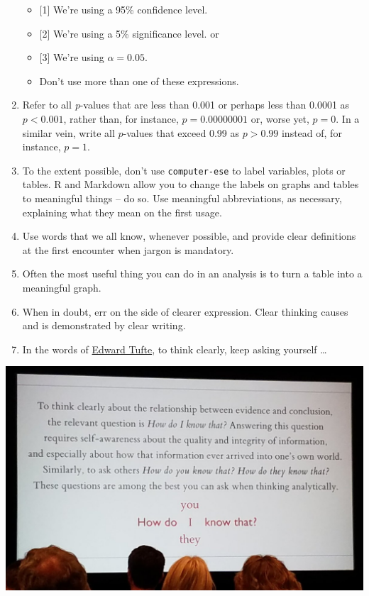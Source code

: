 \documentclass[
]{book}
\providecommand{\tightlist}{%
  \setlength{\itemsep}{0pt}\setlength{\parskip}{0pt}}
\begin{document}
\begin{enumerate}
  \begin{itemize}
  \tightlist
  \item
    {[}1{]} We're using a 95\% confidence level.\\
  \item
    {[}2{]} We're using a 5\% significance level. or
  \item
    {[}3{]} We're using \(\alpha = 0.05\).\\
  \item
    Don't use more than one of these expressions.
  \end{itemize}
\item
  Refer to all \emph{p}-values that are less than 0.001 or perhaps less than 0.0001 as \(p < 0.001\), rather than, for instance, \(p = 0.00000001\) or, worse yet, \(p = 0\). In a similar vein, write all \(p\)-values that exceed 0.99 as \(p > 0.99\) instead of, for instance, \(p = 1\).
\item
  To the extent possible, don't use \texttt{computer-ese} to label variables, plots or tables. R and Markdown allow you to change the labels on graphs and tables to meaningful things -- do so. Use meaningful abbreviations, as necessary, explaining what they mean on the first usage.
\item
  Use words that we all know, whenever possible, and provide clear definitions at the first encounter when jargon is mandatory.
\item
  Often the most useful thing you can do in an analysis is to turn a table into a meaningful graph.
\item
  When in doubt, err on the side of clearer expression. Clear thinking causes and is demonstrated by clear writing.
\item
  In the words of \href{https://twitter.com/kjspin7/status/886006382993915904}{Edward Tufte}, to think clearly, keep asking yourself \ldots{}
\end{enumerate}

\includegraphics[width=0.85\linewidth]{figures/Tuftequote}

\backmatter
  
\end{document}
